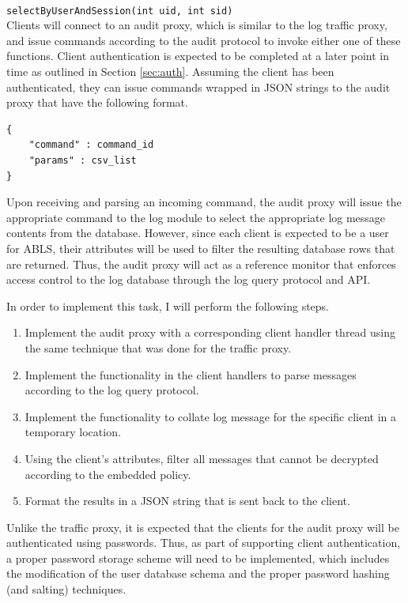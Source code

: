 \documentclass{sig-alternate}
\begin{document}
 \\
{\tt selectByUserAndSession(int uid, int sid)}\\

Clients will connect to an audit proxy, which is similar to the log traffic proxy, and issue commands according to
the audit protocol to invoke either one of these functions. Client authentication is expected to be completed at a later
point in time as outlined in Section \ref{sec:auth}. Assuming the client has been authenticated, they can issue commands
wrapped in JSON strings to the audit proxy that have the following format. \\

\begin{lstlisting}
{     
    "command" : command_id
    "params" : csv_list
}
\end{lstlisting}

Upon receiving and parsing an incoming command, the audit proxy will issue the appropriate command to the log module
to select the appropriate log message contents from the database. However, since each client is expected to be a user for
ABLS, their attributes will be used to filter the resulting database rows that are returned. Thus, the audit proxy will act
as a reference monitor that enforces access control to the log database through the log query protocol and API.

In order to implement this task, I will perform the following steps.

\begin{enumerate}
	\item Implement the audit proxy with a corresponding client handler thread using the same technique that was done for the traffic proxy. 
	\item Implement the functionality in the client handlers to parse messages according to the log query protocol.
	\item Implement the functionality to collate log message for the specific client in a temporary location.
	\item Using the client's attributes, filter all messages that cannot be decrypted according to the embedded policy.
	\item Format the results in a JSON string that is sent back to the client.
\end{enumerate}

Unlike the traffic proxy, it is expected that the clients for the audit proxy will be authenticated using passwords. Thus, as
part of supporting client authentication, a proper password storage scheme will need to be implemented, which includes 
the modification of the user database schema and the proper password hashing (and salting) techniques. 
\end{document}
